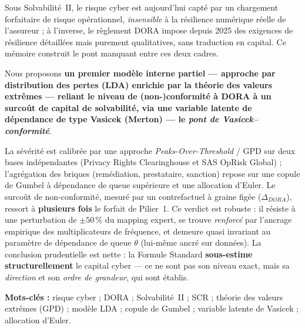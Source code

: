 \documentclass[11pt,a4paper]{article}
\theoremstyle{navystyle}
\theoremstyle{navydef}
\begin{document}
Sous Solvabilité~II, le risque cyber est aujourd'hui capté par un chargement
forfaitaire de risque opérationnel, \emph{insensible} à la résilience numérique
réelle de l'assureur ; à l'inverse, le règlement DORA impose depuis 2025 des
exigences de résilience détaillées mais purement qualitatives, sans traduction
en capital. Ce mémoire construit le pont manquant entre ces deux cadres.

\begin{formulekey}[Contribution]
Nous proposons \textbf{un premier modèle interne partiel --- approche par
distribution des pertes (LDA) enrichie par la théorie des valeurs extrêmes ---
reliant le niveau de (non-)conformité à DORA à un surcoût de capital de
solvabilité, via une variable latente de dépendance de type Vasicek (Merton) ---
le \emph{pont de Vasicek--conformité}}.
\end{formulekey}

\noindent La sévérité est calibrée par une approche \emph{Peaks-Over-Threshold}
/ GPD sur deux bases indépendantes (Privacy Rights Clearinghouse et SAS OpRisk
Global) ; l'agrégation des briques (remédiation, prestataire, sanction) repose
sur une copule de Gumbel à dépendance de queue supérieure et une allocation
d'Euler. Le surcoût de non-conformité, mesuré par un contrefactuel à graine
figée ($\Delta_{DORA}$), ressort à \textbf{plusieurs fois} le forfait de
Pilier~1. Ce verdict est robuste : il résiste à une perturbation de
$\pm50\,\%$ du mapping expert, se trouve \emph{renforcé} par l'ancrage empirique
des multiplicateurs de fréquence, et demeure quasi invariant au paramètre de
dépendance de queue $\theta$ (lui-même ancré sur données). La conclusion
prudentielle est nette : la Formule Standard \textbf{sous-estime
structurellement} le capital cyber --- ce ne sont pas son niveau exact, mais sa
\emph{direction} et son \emph{ordre de grandeur}, qui sont établis.

\medskip
\noindent\textbf{Mots-clés :} risque cyber ; DORA ; Solvabilité~II ; SCR ;
théorie des valeurs extrêmes (GPD) ; modèle LDA ; copule de Gumbel ; variable
latente de Vasicek ; allocation d'Euler.
\end{document}
